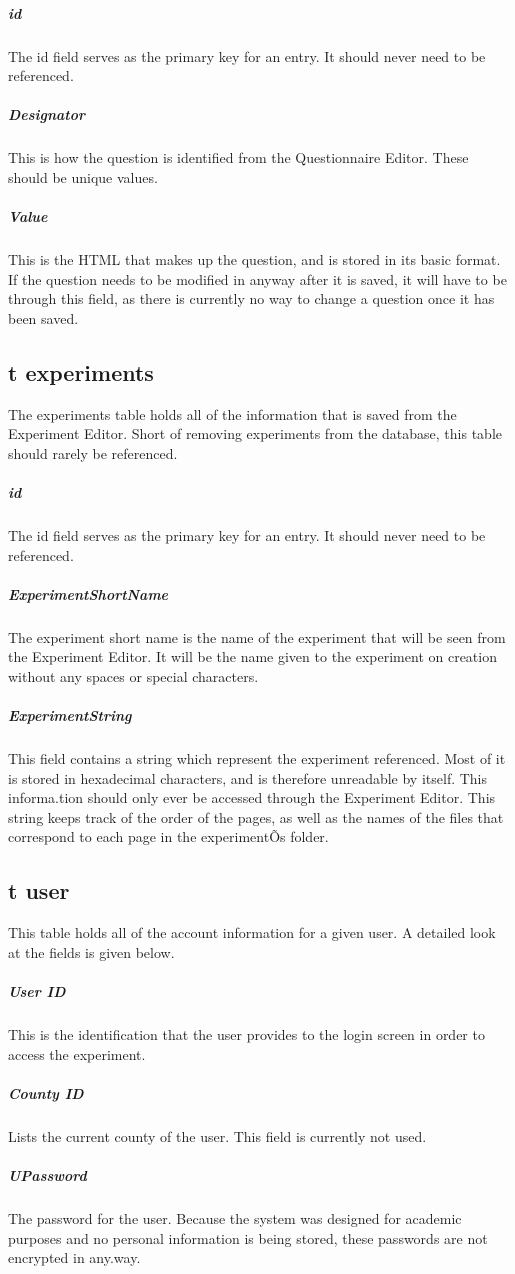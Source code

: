 \documentclass[article]{ij4uq}              %
\begin{document}
\subparagraph{id}
The id field serves as the primary key for an entry. It should never need to be referenced. 

\subparagraph{Designator}
This is how the question is identified from the Questionnaire Editor. These should be unique values. 

\subparagraph{Value}
This is the HTML that makes up the question, and is stored in its basic format. If the question needs to be modified in anyway after it is saved, it will have to be through this field, as there is currently no way to change a question once it has been saved. 


\subsection{t experiments }
The experiments table holds all of the information that is saved from the Experiment Editor. Short of removing experiments from the database, this table should rarely be referenced. 

\subparagraph{id} 
The id field serves as the primary key for an entry. It should never need to be referenced. 

\subparagraph{ExperimentShortName}
The experiment short name is the name of the experiment that will be seen from the Experiment Editor. It will be the name given to the experiment on creation without any spaces or special characters. 

\subparagraph{ExperimentString}
This field contains a string which represent the experiment referenced. Most of it is stored in hexadecimal characters, and is therefore unreadable by itself. This informa.tion should only ever be accessed through the Experiment Editor. This string keeps track of the order of the pages, as well as the names of the files that correspond to each page in the experimentÕs folder. 


\subsection{t user}
This table holds all of the account information for a given user. A detailed look at the fields is given below.

\subparagraph{User ID}
This is the identification that the user provides to the login screen in order to access the experiment. 

\subparagraph{County ID}
Lists the current county of the user. This field is currently not used. 

\subparagraph{UPassword}
The password for the user. Because the system was designed for academic purposes and no personal information is being stored, these passwords are not encrypted in any.way.
\end{document}
